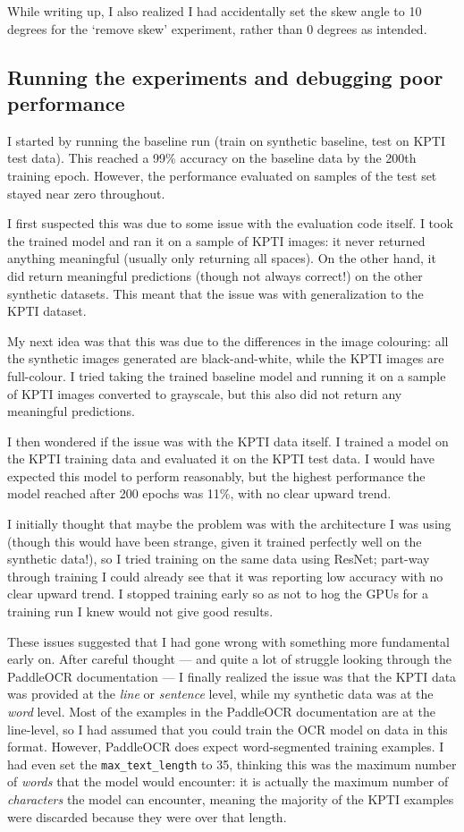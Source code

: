 \documentclass[twocolumn,11pt]{extarticle}
\begin{document}
While writing up, I also realized I had accidentally set the skew angle to 10 degrees for the `remove skew' experiment, rather than 0 degrees as intended. 

\subsection{Running the experiments and debugging poor performance}

I started by running the baseline run (train on synthetic baseline, test on KPTI test data). This reached a 99\% accuracy on the baseline data by the 200th training epoch. However, the performance evaluated on samples of the test set stayed near zero throughout. 

I first suspected this was due to some issue with the evaluation code itself. I took the trained model and ran it on a sample of KPTI images: it never returned anything meaningful (usually only returning all spaces). On the other hand, it did return meaningful predictions (though not always correct!) on the other synthetic datasets. This meant that the issue was with generalization to the KPTI dataset.

My next idea was that this was due to the differences in the image colouring: all the synthetic images generated are black-and-white, while the KPTI images are full-colour. I tried taking the trained baseline model and running it on a sample of KPTI images converted to grayscale, but this also did not return any meaningful predictions.

I then wondered if the issue was with the KPTI data itself. I trained a model on the KPTI training data and evaluated it on the KPTI test data. I would have expected this model to perform reasonably, but the highest performance the model reached after 200 epochs was 11\%, with no clear upward trend. 

I initially thought that maybe the problem was with the architecture I was using (though this would have been strange, given it trained perfectly well on the synthetic data!), so I tried training on the same data using ResNet; part-way through training I could already see that it was reporting low accuracy with no clear upward trend. I stopped training early so as not to hog the GPUs for a training run I knew would not give good results.

These issues suggested that I had gone wrong with something more fundamental early on. After careful thought --- and quite a lot of struggle looking through the PaddleOCR documentation --- I finally realized the issue was that the KPTI data was provided at the \textit{line} or \textit{sentence} level, while my synthetic data was at the \textit{word} level. Most of the examples in the PaddleOCR documentation are at the line-level, so I had assumed that you could train the OCR model on data in this format. However, PaddleOCR does expect word-segmented training examples. I had even set the \verb|max_text_length| to 35, thinking this was the maximum number of \textit{words} that the model would encounter: it is actually the maximum number of \textit{characters} the model can encounter, meaning the majority of the KPTI examples were discarded because they were over that length. 
\end{document}
